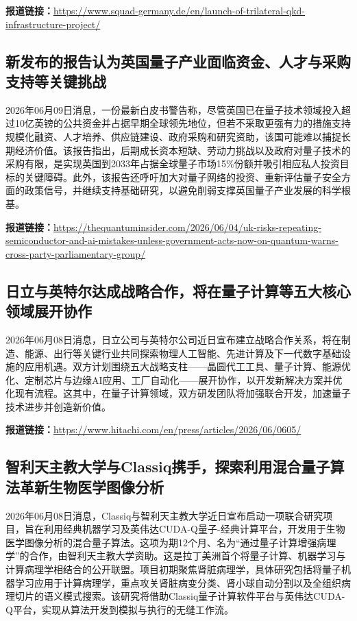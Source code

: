 \documentclass[12pt,a4paper]{ctexart}
\begin{document}
\noindent\textbf{报道链接：}\url{https://www.squad-germany.de/en/launch-of-trilateral-qkd-infrastructure-project/}

\subsection{ 新发布的报告认为英国量子产业面临资金、人才与采购支持等关键挑战 }

2026年06月09日消息，一份最新白皮书警告称，尽管英国已在量子技术领域投入超过10亿英镑的公共资金并占据早期全球领先地位，但若不采取更强有力的措施支持规模化融资、人才培养、供应链建设、政府采购和研究资助，该国可能难以捕捉长期经济价值。该报告指出，后期成长资本短缺、劳动力挑战以及政府对量子技术的采购有限，是实现英国到2033年占据全球量子市场15\%份额并吸引相应私人投资目标的关键障碍。此外，该报告还呼吁加大对量子网络的投资、重新评估量子安全方面的政策信号，并继续支持基础研究，以避免削弱支撑英国量子产业发展的科学根基。

\noindent\textbf{报道链接：}\url{https://thequantuminsider.com/2026/06/04/uk-risks-repeating-semiconductor-and-ai-mistakes-unless-government-acts-now-on-quantum-warns-cross-party-parliamentary-group/}

\subsection{ 日立与英特尔达成战略合作，将在量子计算等五大核心领域展开协作 }

2026年06月08日消息，日立公司与英特尔公司近日宣布建立战略合作关系，将在制造、能源、出行等关键行业共同探索物理人工智能、先进计算及下一代数字基础设施的应用机遇。双方计划围绕五大战略支柱——晶圆代工工具、量子计算、能源优化、定制芯片与边缘AI应用、工厂自动化——展开协作，以开发新解决方案并优化现有流程。这其中，在量子计算领域，双方研发团队将加强联合开发，加速量子技术进步并创造新价值。

\noindent\textbf{报道链接：}\url{https://www.hitachi.com/en/press/articles/2026/06/0605/}

\subsection{ 智利天主教大学与Classiq携手，探索利用混合量子算法革新生物医学图像分析 }

2026年06月08日消息，Classiq与智利天主教大学近日宣布启动一项联合研究项目，旨在利用经典机器学习及英伟达CUDA-Q量子-经典计算平台，开发用于生物医学图像分析的混合量子算法。这项为期12个月、名为“通过量子计算增强病理学”的合作，由智利天主教大学资助。这是拉丁美洲首个将量子计算、机器学习与计算病理学相结合的公开联盟。项目初期聚焦肾脏病理学，具体研究包括将量子机器学习应用于计算病理学，重点攻关肾脏病变分类、肾小球自动分割以及全组织病理切片的语义模式搜索。该研究将借助Classiq量子计算软件平台与英伟达CUDA-Q平台，实现从算法开发到模拟与执行的无缝工作流。
\end{document}
